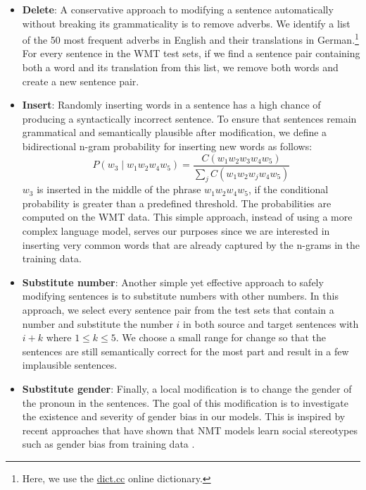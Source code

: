 \begin{itemize}%
\item \textbf{Delete}: A conservative approach to modifying a sentence automatically without breaking its grammaticality is to remove adverbs. 
We identify a list of the 50 most frequent adverbs in English and their translations in German.\footnote{Here, we use the \url{dict.cc} online dictionary.}
For every sentence in the WMT test sets, if we find a sentence pair containing both a word and its translation from this list, we remove both words and create a new sentence pair. 
\item \textbf{Insert}: Randomly inserting words in a sentence has a high chance of producing a syntactically incorrect sentence.
To ensure that sentences remain grammatical and semantically plausible after modification, we define a bidirectional n-gram probability for inserting new words as follows:
\begin{equation}
P(w_3 \mid w_1 w_2 w_4 w_5) = \frac{C(w_1 w_2 w_3 w_4 w_5)}{\sum_j C(w_1 w_2 w_j w_4 w_5)}
\end{equation}
$w_3$ is inserted in the middle of the phrase $w_1 w_2 w_4 w_5$, if the conditional probability is greater than a predefined threshold.  
The probabilities are computed on the WMT data.
This simple approach, instead of using a more complex language model, serves our purposes since we are interested in inserting very common words that are already captured by the n-grams in the training data.

\item \textbf{Substitute number}: Another simple yet effective approach to safely modifying sentences %
is to substitute numbers with other numbers.
In this approach, we select every sentence pair from the test sets that contain a number and substitute the number $i$ in both source and target sentences with $i+k$ where $1 \leq k \leq 5$.
We choose a small range for change so that the sentences are still semantically correct for the most part and result in a few implausible sentences.
\item \textbf{Substitute gender}: Finally, a local modification  
is to change the gender of the pronoun in the sentences. 
The goal of this modification is to investigate the existence and severity of gender bias in our models.
This is inspired by recent approaches that have shown that NMT models learn social stereotypes such as gender bias from training data \citep{escude-font-costa-jussa-2019-equalizing,stanovsky-etal-2019-evaluating}.  
\end{itemize}

